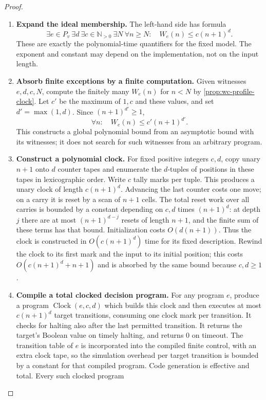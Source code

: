 \documentclass[11pt,a4paper]{article}
\numberwithin{algorithm}{section}
\numberwithin{equation}{section}
\theoremstyle{definition}
\theoremstyle{remark}
\theoremstyle{plain}
\newcommand{\N}{\mathbb N}
\theoremstyle{definition}
\theoremstyle{plain}
\begin{document}
\begin{proof}\leavevmode
\begin{enumerate}[leftmargin=*,align=left]
\item \textbf{Expand the ideal membership.}
The left-hand side has formula
\[
 \exists e\in P_v\ \exists d\ \exists c\in\N_{>0}\ \exists N\
 \forall n\ge N:\quad W_e(n)\le c(n+1)^d.
\]
These are exactly the polynomial-time quantifiers for the fixed model.
The exponent and constant may depend on the implementation, not on
the input length.
\item \textbf{Absorb finite exceptions by a finite computation.}
Given witnesses $e,d,c,N$, compute the finitely many $W_e(n)$ for
$n<N$ by \cref{prop:wc-profile-clock}. Let $c'$ be the maximum of $1,c$ and
these values, and set $d'=\max(1,d)$. Since $(n+1)^{d'}\ge1$,
\[
 \forall n:\quad W_e(n)\le c'(n+1)^{d'}.
\]
This constructs a global polynomial bound from an asymptotic bound
with its witnesses; it does not search for such witnesses from an
arbitrary program.
\item \textbf{Construct a polynomial clock.}
For fixed positive integers $c,d$, copy unary $n+1$ onto $d$ counter
tapes and enumerate the $d$-tuples of positions in these tapes in
lexicographic order. Write $c$ tally marks per tuple. This produces
a unary clock of length $c(n+1)^d$. Advancing the last counter costs
one move; on a carry it is reset by a scan of $n+1$ cells. The total
reset work over all carries is bounded by a constant depending on
$c,d$ times $(n+1)^d$: at depth $j$ there are at most
$(n+1)^{d-j}$ resets of length $n+1$, and the finite sum of these
terms has that bound. Initialization costs $O(d(n+1))$. Thus the
clock is constructed in $O(c(n+1)^d)$ time for its fixed description.
Rewind the clock to its first mark and the input to its initial
position; this costs $O(c(n+1)^d+n+1)$ and is absorbed by the same
bound because $c,d\ge1$.
\item \textbf{Compile a total clocked decision program.}
For any program $e$, produce a program $\operatorname{Clock}(e,c,d)$
which builds this clock and then executes at most $c(n+1)^d$ target
transitions, consuming one clock mark per transition. It checks for
halting also after the last permitted transition. It returns the
target's Boolean value on timely halting, and returns $0$ on timeout.
The transition table of $e$ is incorporated into the compiled finite
control, with an extra clock tape, so the simulation overhead per
target transition is bounded by a constant for that compiled program.
Code generation is effective and total. Every such clocked program

\end{enumerate}
\end{proof}
\end{document}
